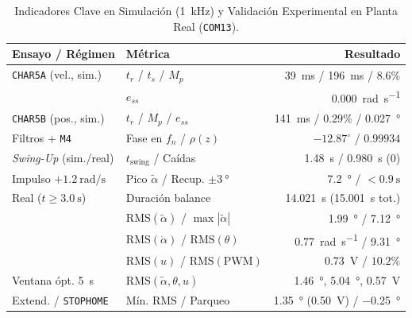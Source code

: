 \begin{table}[!t]
\centering
\caption{Indicadores Clave en Simulación (\qty{1}{\kilo\hertz}) y Validación Experimental en Planta Real (\texttt{COM13}).}
\label{tab:metricas_simulacion_y_exp}
\footnotesize
\setlength{\tabcolsep}{2.5pt}
\begin{tabular}{@{}llr@{}}
\toprule
\textbf{Ensayo / Régimen} & \textbf{Métrica} & \textbf{Resultado} \\
\midrule
\texttt{CHAR5A} (vel., sim.) & $t_r$ / $t_s$ / $M_p$ & \qty{39}{\milli\second} / \qty{196}{\milli\second} / $8.6\%$ \\
 & $e_{ss}$ & \qty{0.000}{\radian\per\second} \\
\texttt{CHAR5B} (pos., sim.) & $t_r$ / $M_p$ / $e_{ss}$ & \qty{141}{\milli\second} / $0.29\%$ / \qty{0.027}{\degree} \\
Filtros + \texttt{M4} & Fase en $f_n$ / $\rho(z)$ & $-12.87^\circ$ / $0.99934$ \\
\midrule
\textit{Swing-Up} (sim./real) & $t_{\text{swing}}$ / Caídas & \qty{1.48}{\second} / \qty{0.980}{\second} ($0$) \\
Impulso $+\qty{1.2}{\radian\per\second}$ & Pico $\tilde{\alpha}$ / Recup. $\pm\qty{3}{\degree}$ & \qty{7.2}{\degree} / $< \qty{0.9}{\second}$ \\
\midrule
Real ($t \ge \qty{3.0}{\second}$) & Duración balance & \qty{14.021}{\second} (\qty{15.001}{\second} tot.) \\
 & $\mathrm{RMS}(\tilde{\alpha})$ / $\max|\tilde{\alpha}|$ & \qty{1.99}{\degree} / \qty{7.12}{\degree} \\
 & $\mathrm{RMS}(\dot{\alpha})$ / $\mathrm{RMS}(\theta)$ & \qty{0.77}{\radian\per\second} / \qty{9.31}{\degree} \\
 & $\mathrm{RMS}(u)$ / $\mathrm{RMS}(\text{PWM})$ & \qty{0.73}{\volt} / $10.2\%$ \\
Ventana ópt. \qty{5}{\second} & $\mathrm{RMS}(\tilde{\alpha},\theta,u)$ & \qty{1.46}{\degree}, \qty{5.04}{\degree}, \qty{0.57}{\volt} \\
Extend. / \texttt{STOPHOME} & Mín. RMS / Parqueo & \qty{1.35}{\degree} (\qty{0.50}{\volt}) / \qty{-0.25}{\degree} \\
\bottomrule
\end{tabular}
\end{table}
